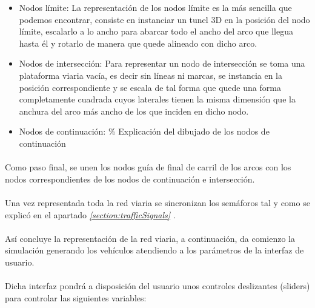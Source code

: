 	\begin{itemize}
	\item Nodos límite:
	\newline
	La representación de los nodos límite es la más sencilla que podemos encontrar, consiste en instanciar un tunel 3D en la posición del nodo límite, escalarlo a lo ancho para abarcar todo el ancho del arco que llegua hasta él y rotarlo de manera que quede alineado con dicho arco.
	
	\item Nodos de intersección:
	\newline
	Para representar un nodo de intersección se toma una plataforma viaria vacía, es decir sin líneas ni marcas, se instancia en la posición correspondiente y se escala de tal forma que quede una forma completamente cuadrada cuyos laterales tienen la misma dimensión que la anchura del arco más ancho de los que inciden en dicho nodo.
	
	\item Nodos de continuación:
	\newline	
	\% Explicación del dibujado de los nodos de continuación
	
	\end{itemize}
	
	\paragraph{}
	Como paso final, se unen los nodos guía de final de carril de los arcos con los nodos correspondientes de los nodos de continuación e intersección.
	
	\paragraph{}
	Una vez representada toda la red viaria se sincronizan los semáforos tal y como se explicó en el apartado \emph{\ref{section:trafficSignals} }.
	
	\paragraph{}
	Así concluye la representación de la red viaria, a continuación, da comienzo la simulación generando los vehículos atendiendo a los parámetros de la interfaz de usuario.
	
	\paragraph{}
	Dicha interfaz pondrá a disposición del usuario unos controles deslizantes (sliders) para controlar las siguientes variables:
	
